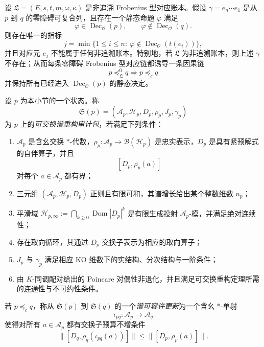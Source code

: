 \begin{theorem}[非可逆对应演化的首破账本定理]\label{distill:connes_consani_arithmetic_site-frobenius_correspondence_spacetime_skeleton-first-break-ledger}
设 \(\mathfrak L=(E,s,t,m,\omega,\kappa)\) 是非追溯 Frobenius 型对应账本。假设 \(\gamma=e_n\cdots e_1\) 是从 \(p\) 到 \(q\) 的零障碍可复合列，且存在一个静态命题 \(\varphi\) 满足
\[
\varphi\in \operatorname{Dec}_{\mathcal O}(p),\qquad
\varphi\notin \operatorname{Dec}_{\mathcal O}(q).
\]
则存在唯一的指标
\[
j=\min\{1\le i\le n:\ \varphi\notin
\operatorname{Dec}_{\mathcal O}(t(e_i))\},
\]
并且对应元 \(e_j\) 不能属于任何非追溯账本。特别地，若 \(\mathfrak L\) 为非追溯账本，则上述 \(\gamma\) 不存在；从而每条零障碍 Frobenius 型对应链都诱导一条因果链
\[
p\preceq_{\mathfrak L}^{0}q\Longrightarrow p\preceq_c q
\]
并保持所有已经进入 \(\operatorname{Dec}_{\mathcal O}(p)\) 的静态决定。
\end{theorem}
\begin{definition}[可交换谱重构审计包]\label{distill:connes_spectral_triples_and_chamseddine_connes_spectral_action-commutative_reconstruction_schema-spectral-reconstruction-audit-packet}
设 \(p\) 为本小节的一个状态。称
\[
\mathfrak S(p)=(\mathcal A_p,\mathcal H_p,D_p,\rho_p,J_p,\gamma_p)
\]
为 \(p\) 上的\emph{可交换谱重构审计包}，若满足下列条件：
\begin{enumerate}
  \item \(\mathcal A_p\) 是含幺交换 \(*\)-代数，\(\rho_p:\mathcal A_p\to\mathcal B(\mathcal H_p)\) 是忠实表示，\(D_p\) 是具有紧预解式的自伴算子，并且
  \[
  [D_p,\rho_p(a)]
  \]
  对每个 \(a\in\mathcal A_p\) 都有界；
  \item 三元组 \((\mathcal A_p,\mathcal H_p,D_p)\) 正则且有限可和，其谱增长给出某个整数维数 \(n_p\)；
  \item 平滑域 \(\mathcal H_{p,\infty}:=\bigcap_{k\ge 0}\operatorname{Dom}|D_p|^k\) 是有限生成投射 \(\mathcal A_p\)-模，并满足绝对连续性；
  \item 存在取向循环，其通过 \(D_p\)-交换子表示为相应的取向算子；
  \item \(J_p\) 与 \(\gamma_p\) 满足相应 KO 维数下的实结构、分次结构与一阶条件；
  \item 由 \(K\)-同调配对给出的 Poincare 对偶性非退化，并且满足可交换重构定理所需的连通性与不可约性条件。
\end{enumerate}
若 \(p\preceq_c q\)，称从 \(\mathfrak S(p)\) 到 \(\mathfrak S(q)\) 的一个\emph{谱可容许更新}为一个含幺 \(*\)-单射
\[
\iota_{pq}:\mathcal A_p\longrightarrow \mathcal A_q
\]
使得对所有 \(a\in\mathcal A_p\) 都有交换子预算不增条件
\[
\bigl\|[D_q,\rho_q(\iota_{pq}(a))]\bigr\|\le
\bigl\|[D_p,
\rho_p(a)]\bigr\|.
\]
\end{definition}

